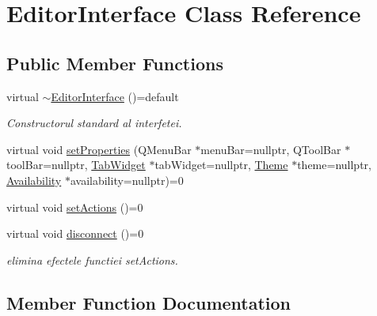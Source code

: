 \hypertarget{class_editor_interface}{}\section{Editor\+Interface Class Reference}
\label{class_editor_interface}
\subsection*{Public Member Functions}
\begin{DoxyCompactItemize}
\item 
\mbox{\label{class_editor_interface_a6ddb816bdfe63849bbe4abf49e72058a}} 
virtual \hyperlink{class_editor_interface_a6ddb816bdfe63849bbe4abf49e72058a}{$\sim$\+Editor\+Interface} ()=default
\begin{DoxyCompactList}\small\item\em Constructorul standard al interfetei. \end{DoxyCompactList}\item 
virtual void \hyperlink{class_editor_interface_ae05ad16a2fec202fbc24c2111b163287}{set\+Properties} (Q\+Menu\+Bar $\ast$menu\+Bar=nullptr, Q\+Tool\+Bar $\ast$tool\+Bar=nullptr, \hyperlink{class_tab_widget}{Tab\+Widget} $\ast$tab\+Widget=nullptr, \hyperlink{class_theme}{Theme} $\ast$theme=nullptr, \hyperlink{class_availability}{Availability} $\ast$availability=nullptr)=0
\item 
virtual void \hyperlink{class_editor_interface_ac52475577ba3c2cabe59803a1da8ca89}{set\+Actions} ()=0
\item 
\mbox{\label{class_editor_interface_afe0c0037f318308d4b350bd4a6f58c7e}} 
virtual void \hyperlink{class_editor_interface_afe0c0037f318308d4b350bd4a6f58c7e}{disconnect} ()=0
\begin{DoxyCompactList}\small\item\em elimina efectele functiei set\+Actions. \end{DoxyCompactList}\end{DoxyCompactItemize}


\subsection{Member Function Documentation}
\mbox{\label{class_editor_interface_ac52475577ba3c2cabe59803a1da8ca89}} 
